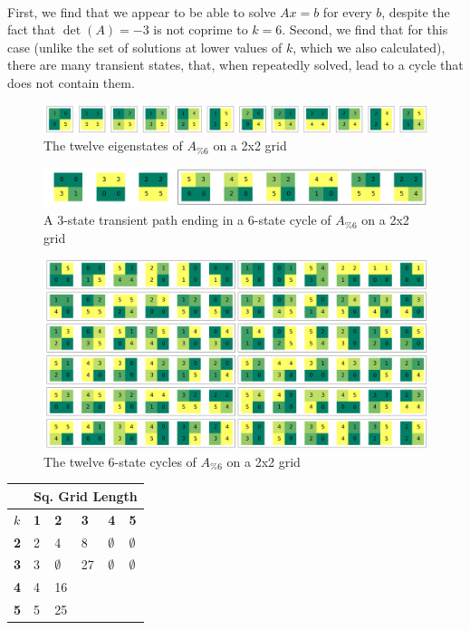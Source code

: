 \documentclass[11pt]{article}
\begin{document}
\paragraph{} First, we find that we appear to be able to solve $Ax=b$ for every $b$, despite the fact that $\det(A) = -3$ is not coprime to $k=6$. Second, we find that for this case (unlike the set of solutions at lower values of $k$, which we also calculated), there are many transient states, that, when repeatedly solved, lead to a cycle that does not contain them.



\begin{figure}
\caption{The twelve eigenstates of $A_{\% 6}$ on a 2x2 grid}
\label{eig622}
\includegraphics[width=\textwidth]{eig622.png}
\end{figure}

\begin{figure}
  \caption{A 3-state transient path ending in a 6-state cycle of $A_{\% 6}$ on a 2x2 grid}
\label{cycle622}
\includegraphics[width=\textwidth]{cycle622.png}
\end{figure}

\begin{figure}
\caption{The twelve 6-state cycles of $A_{\% 6}$ on a 2x2 grid}
\label{cycle622}
\includegraphics[width=\textwidth]{all-len-6-cycles-622.png}
\end{figure}

\begin{tabular}{|l|l|l|l|l|l|}
  \hline
  & \multicolumn{5}{|c|}{Sq. Grid Length} \\ \hline
  $k$ & \textbf{1} & \textbf{2} & \textbf{3} & \textbf{4} & \textbf{5} \\ \hline
  \textbf{2} & 2 & 4 & 8 & $\emptyset$ & $\emptyset$ \\ \hline
  \textbf{3} & 3 & $\emptyset$ & 27 & $\emptyset$ & $\emptyset$ \\ \hline
  \textbf{4} & 4 & 16 & \\ \hline
  \textbf{5} & 5 & 25 \\ \hline
\end{tabular}
\end{document}

